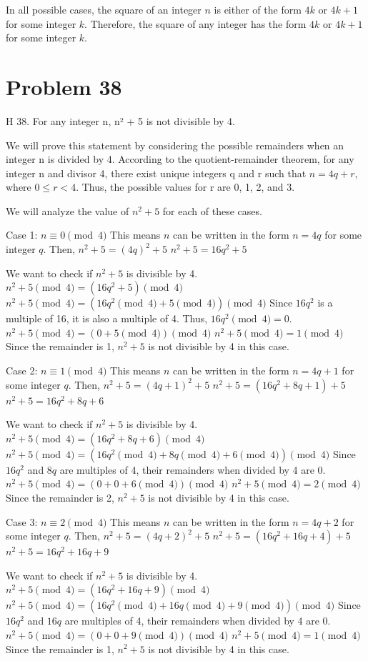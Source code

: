 \documentclass{article}
\begin{document}
In all possible cases, the square of an integer $n$ is either of the form $4k$ or $4k+1$ for some integer $k$.
Therefore, the square of any integer has the form $4k$ or $4k+1$ for some integer $k$.

\newpage

\section*{Problem 38}
H 38. For any integer n, n² + 5 is not divisible by 4.

We will prove this statement by considering the possible remainders when an integer n is divided by 4. According to the quotient-remainder theorem, for any integer n and divisor 4, there exist unique integers q and r such that $n = 4q + r$, where $0 \le r < 4$. Thus, the possible values for r are 0, 1, 2, and 3.

We will analyze the value of $n^2 + 5$ for each of these cases.

Case 1: $n \equiv 0 \pmod{4}$
This means $n$ can be written in the form $n = 4q$ for some integer $q$.
Then, $n^2 + 5 = (4q)^2 + 5$
$n^2 + 5 = 16q^2 + 5$

We want to check if $n^2 + 5$ is divisible by 4.
$n^2 + 5 \pmod{4} = (16q^2 + 5) \pmod{4}$
$n^2 + 5 \pmod{4} = (16q^2 \pmod{4} + 5 \pmod{4}) \pmod{4}$
Since $16q^2$ is a multiple of 16, it is also a multiple of 4. Thus, $16q^2 \pmod{4} = 0$.
$n^2 + 5 \pmod{4} = (0 + 5 \pmod{4}) \pmod{4}$
$n^2 + 5 \pmod{4} = 1 \pmod{4}$
Since the remainder is 1, $n^2 + 5$ is not divisible by 4 in this case.

Case 2: $n \equiv 1 \pmod{4}$
This means $n$ can be written in the form $n = 4q + 1$ for some integer $q$.
Then, $n^2 + 5 = (4q + 1)^2 + 5$
$n^2 + 5 = (16q^2 + 8q + 1) + 5$
$n^2 + 5 = 16q^2 + 8q + 6$

We want to check if $n^2 + 5$ is divisible by 4.
$n^2 + 5 \pmod{4} = (16q^2 + 8q + 6) \pmod{4}$
$n^2 + 5 \pmod{4} = (16q^2 \pmod{4} + 8q \pmod{4} + 6 \pmod{4}) \pmod{4}$
Since $16q^2$ and $8q$ are multiples of 4, their remainders when divided by 4 are 0.
$n^2 + 5 \pmod{4} = (0 + 0 + 6 \pmod{4}) \pmod{4}$
$n^2 + 5 \pmod{4} = 2 \pmod{4}$
Since the remainder is 2, $n^2 + 5$ is not divisible by 4 in this case.

Case 3: $n \equiv 2 \pmod{4}$
This means $n$ can be written in the form $n = 4q + 2$ for some integer $q$.
Then, $n^2 + 5 = (4q + 2)^2 + 5$
$n^2 + 5 = (16q^2 + 16q + 4) + 5$
$n^2 + 5 = 16q^2 + 16q + 9$

We want to check if $n^2 + 5$ is divisible by 4.
$n^2 + 5 \pmod{4} = (16q^2 + 16q + 9) \pmod{4}$
$n^2 + 5 \pmod{4} = (16q^2 \pmod{4} + 16q \pmod{4} + 9 \pmod{4}) \pmod{4}$
Since $16q^2$ and $16q$ are multiples of 4, their remainders when divided by 4 are 0.
$n^2 + 5 \pmod{4} = (0 + 0 + 9 \pmod{4}) \pmod{4}$
$n^2 + 5 \pmod{4} = 1 \pmod{4}$
Since the remainder is 1, $n^2 + 5$ is not divisible by 4 in this case.
\end{document}
